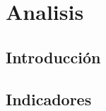 \chapter{Analisis}\label{ch:analisis}
\section{Introducción}\label{sec:introduccion_analisis}
\lipsum[1]

\section{Indicadores}\label{sec:indicadores_analisis}
\lipsum[2-4]